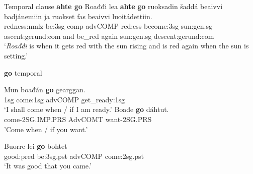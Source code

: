 \documentclass[a4,12pt]{scrartcl}
\begin{document}
\begin{exe}
	\ex \label{ahteGo} Temporal clause \textbf{ahte go} \citep[196]{nickel1994}
	\gll Roađđi lea {\bf ahte} {\bf go} ruoksadin šaddá beaivvi badjánemiin ja ruokset fas beaivvi luoitádettiin.\\
	redness:{\sc nmlz} be:{\sc 3sg} {\sc comp} {\sc advCOMP} red:{\sc ess} become:{\sc 3sg} sun:{\sc gen.sg} ascent:{\sc gerund:com} and be\_red again sun:{\sc gen.sg} descent:{\sc gerund:com}\\
	\glt ‘{\it Roađđi} is when it gets red with the sun rising and is red again when the sun is setting.'


\ex \textbf{go} temporal \label{goTemporal}
\begin{xlist}
\ex %
\citep[196]{nickel1994}
\gll 	Mun 	boađán 	{\bf go} 	gearggan.\\
	{\sc 1sg} come:{\sc 1sg} {\sc advCOMP} get\_ready:{\sc 1sg}\\
\glt 	‘I shall come when / if I am ready.’%
%
\ex \label{goContextDisambig} \cite[196–7]{nickel1994}
\gll Boađe {\bf go} dáhtut.\\ %
come-2SG.IMP.PRS AdvCOMT want-2SG.PRS\\
\glt 'Come when / if you want.'
%


\ex %
\citep[436]{nickel1994}%
\gll 	Buorre 	lei 	{\bf go} 	bohtet\\
	good:{\sc pred} be:{\sc 3sg.pst} {\sc advCOMP} come:{\sc 2sg.pst}\\
\glt 	‘It was good that you came.’
\end{xlist}



\end{exe}
\end{document}
